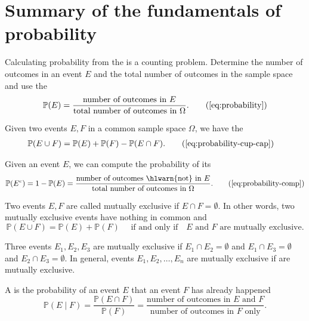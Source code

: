 \documentclass[../main.tex]{subfiles}
\begin{document}
 \section{Summary of the fundamentals of probability}

Calculating probability from the  is a counting problem. Determine the number of outcomes in an event \(E\) and the total number of outcomes in the sample space and use the 
\begin{equation}
  \mathbb{P}(E) = \frac{\text{number of outcomes in \(E\)}}{\text{total number of outcomes in \(\Omega\)}}. \tag{\ref{eq:probability}}
\end{equation}

Given two events \(E,F\) in a common sample space \(\Omega\), we have the 
\begin{align}
  \mathbb{P}(E \cup F) 
  &= \mathbb{P}(E) + \mathbb{P}(F) - \mathbb{P}(E \cap F). \tag{\ref{eq:probability-cup-cap}}
\end{align}

Given an event \(E\), we can compute the probability of its 
\begin{equation}
  \mathbb{P}(E^{c}) = 1 - \mathbb{P}(E) = \frac{\text{number of outcomes \hlwarn{not} in \(E\)}}{\text{total number of outcomes in \(\Omega\)}}. 
  \tag{\ref{eq:probability-comp}}
\end{equation}

Two events \(E,F\) are called mutually exclusive if \(E \cap F = \emptyset\). In other words, two mutually exclusive events have nothing in common and
\[
\mathbb{P}(E \cup F) = \mathbb{P}(E) + \mathbb{P}(F) \quad\text{ if and only if}\quad \text{\(E\) and \(F\) are mutually exclusive}.
\]

Three events \(E_{1}, E_{2}, E_{3}\) are mutually exclusive if \(E_{1} \cap E_{2} = \emptyset\) and \(E_{1} \cap E_{3} = \emptyset\) and \(E_{2} \cap E_{3} = \emptyset\). In general, events \(E_{1}, E_{2}, \ldots, E_{n}\) are mutually exclusive if  are mutually exclusive.

A  is the probability of an event \(E\)  that an event \(F\) has already happened 
\begin{equation}
  \mathbb{P}(E \mid F) = \frac{\mathbb{P}(E \cap F)}{\mathbb{P}(F)} = \frac{\text{number of outcomes in \(E\) and \(F\)}}{\text{number of outcomes in \(F\) only}}.
\end{equation}
\end{document}
